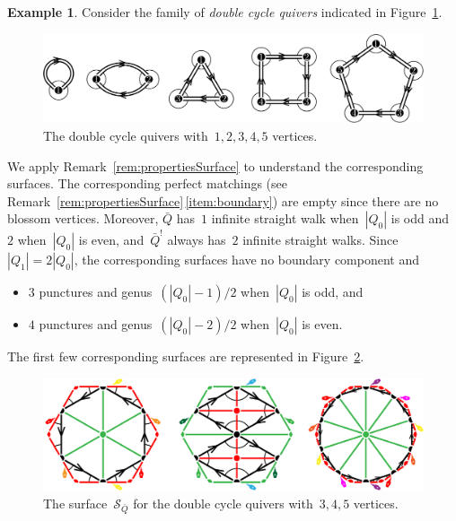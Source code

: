 \documentclass{amsart}
\theoremstyle{definition}
\newtheorem{example}[theorem]{Example}
\newcommand{\fref}[1]{Figure~\ref{#1}} %
\newcommand{\darkblue}{\color{darkblue}} %
\newcommand{\defn}[1]{\textsl{\darkblue #1}} %
\newcommand{\surface}{\mathcal{S}} %
\newcommand{\koszul}{^!} %
\begin{document}
\begin{example}
\label{exm:doubleCycle}
Consider the family of \defn{double cycle quivers} indicated in \fref{fig:doubleCyclesQuivers}.

\begin{figure}[H]
	\capstart
	\centerline{\includegraphics[scale=.45]{doubleCyclesQuivers}}
	\caption{The double cycle quivers with~$1, 2, 3, 4, 5$ vertices.}
	\label{fig:doubleCyclesQuivers}
\end{figure}

We apply Remark~\ref{rem:propertiesSurface} to understand the corresponding surfaces.
The corresponding perfect matchings (see Remark~\ref{rem:propertiesSurface}\,\eqref{item:boundary}) are empty since there are no blossom vertices.
Moreover, $\bar Q$ has~$1$ infinite straight walk when~$|Q_0|$ is odd and~$2$ when~$|Q_0|$ is even, and~$\bar Q\koszul$ always has~$2$ infinite straight walks.
Since~$|Q_1| = 2|Q_0|$, the corresponding surfaces have no boundary component and
\begin{itemize}
\item $3$ punctures and genus~$(|Q_0|-1)/2$ when~$|Q_0|$ is odd, and 
\item $4$ punctures and genus~$(|Q_0|-2)/2$ when~$|Q_0|$ is even.
\end{itemize}
The first few corresponding surfaces are represented in \fref{fig:doubleCyclesSurfaces}.

\begin{figure}[h]
	\capstart
	\centerline{\includegraphics[scale=.7]{doubleCyclesSurfaces}}
	\caption{The surface~$\surface_{\bar Q}$ for the double cycle quivers with~$3, 4, 5$ vertices.}
	\label{fig:doubleCyclesSurfaces}
\end{figure}
\end{example}
\end{document}
